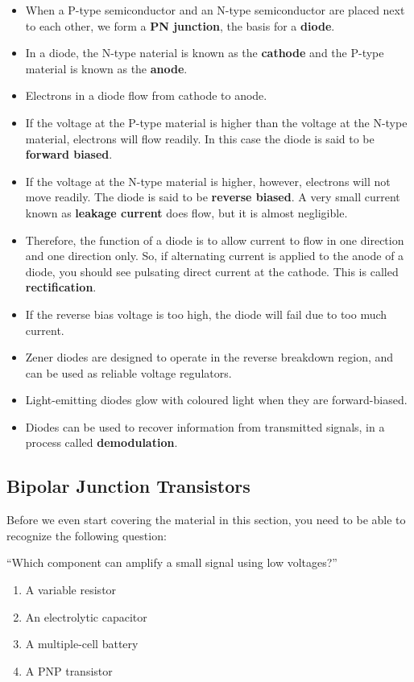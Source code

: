 \documentclass[letterpaper,12pt]{scrartcl}
\begin{document}
\begin{itemize}
\item When a P-type semiconductor and an N-type semiconductor are placed next to each other, we form a \textbf{PN junction}, the basis for a \textbf{diode}.
\item In a diode, the N-type naterial is known as the \textbf{cathode} and the P-type material is known as the \textbf{anode}.
\item Electrons in a diode flow from cathode to anode.
\item If the voltage at the P-type material is higher than the voltage at the N-type material, electrons will flow readily. In this case the diode is said to be \textbf{forward biased}.
\item If the voltage at the N-type material is higher, however, electrons will not move readily. The diode is said to be \textbf{reverse biased}. A very small current known as \textbf{leakage current} does flow,
but it is almost negligible.
\item Therefore, the function of a diode is to allow current to flow in one direction and one direction only. So, if alternating current is applied to the anode of a diode, you should see pulsating direct current at the cathode.
This is called \textbf{rectification}.
\item If the reverse bias voltage is too high, the diode will fail due to too much current.
\item Zener diodes are designed to operate in the reverse breakdown region, and can be used as reliable voltage regulators.
\item Light-emitting diodes glow with coloured light when they are forward-biased.
\item Diodes can be used to recover information from transmitted signals, in a process called \textbf{demodulation}.
\end{itemize}

\subsection{Bipolar Junction Transistors}


Before we even start covering the material in this section, you need to be able to recognize the following question:

``Which component can amplify a small signal using low voltages?''

\begin{enumerate}
\item A variable resistor
\item An electrolytic capacitor
\item A multiple-cell battery
\item A PNP transistor
\end{enumerate}
\end{document}

